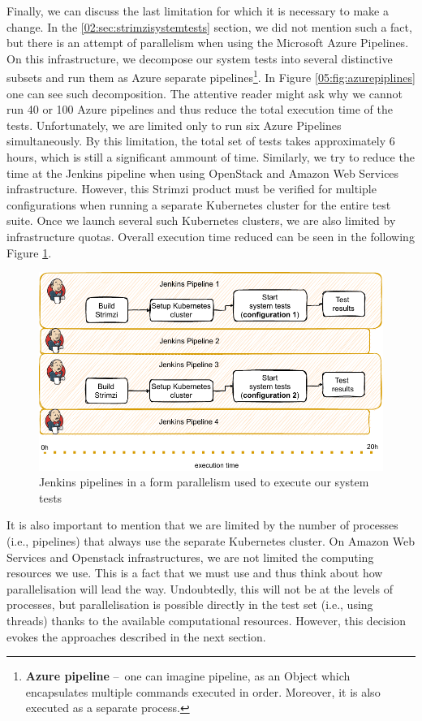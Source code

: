 Finally, we can discuss the last limitation for which it is necessary to make a change.
In the \ref{02:sec:strimzisystemtests} section, we did not mention such a fact, but there is an attempt of parallelism when using the Microsoft Azure Pipelines.
On this infrastructure, we decompose our system tests into several distinctive subsets and run them as Azure separate pipelines\footnote{\textbf{Azure pipeline} \---\ one can imagine pipeline, as an Object which encapsulates multiple commands executed in order. Moreover, it is also executed as a separate process.}.
In Figure \ref{05:fig:azurepiplines} one can see such decomposition.
The attentive reader might ask why we cannot run 40 or 100 Azure pipelines and thus reduce the total execution time of the tests.
Unfortunately, we are limited only to run six Azure Pipelines simultaneously.
By this limitation, the total set of tests takes approximately 6 hours, which is still a significant ammount of time.
Similarly, we try to reduce the time at the Jenkins pipeline when using OpenStack and Amazon Web Services infrastructure.
However, this Strimzi product must be verified for multiple configurations when running a separate Kubernetes cluster for the entire test suite.
Once we launch several such Kubernetes clusters, we are also limited by infrastructure quotas.
Overall execution time reduced can be seen in the following Figure \ref{05:fig:jenkinspipelines}.
\begin{figure}[!ht]
    \centering
    \includegraphics[scale=1]{obrazky-figures/06-proposal-of-parallel-approach/02-jenkins-smaller.pdf}
    \caption{Jenkins pipelines in a form parallelism used to execute our system tests}
    \label{05:fig:jenkinspipelines}
\end{figure}

It is also important to mention that we are limited by the number of processes (i.e., pipelines) that always use the separate Kubernetes cluster.
On Amazon Web Services and Openstack infrastructures, we are not limited the computing resources we use.
This is a fact that we must use and thus think about how parallelisation will lead the way.
Undoubtedly, this will not be at the levels of processes, but parallelisation is possible directly in the test set (i.e., using threads) thanks to the available computational resources.
However, this decision evokes the approaches described in the next section.


